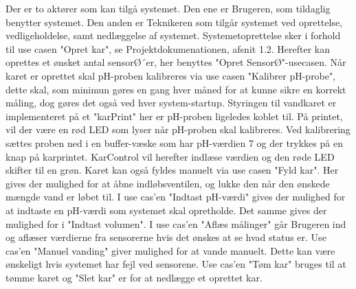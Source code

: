Der er to aktører som kan tilgå systemet. Den ene er Brugeren, som tildaglig benytter systemet. Den anden er Teknikeren som tilgår systemet ved oprettelse, vedligeholdelse, samt nedlæggelse af systemet.\newline 
Systemetoprettelse sker i forhold til use casen "Opret kar", se Projektdokumenationen, afsnit 1.2. Herefter kan oprettes et ønsket antal sensorØ´er, her benyttes "Opret SensorØ"-usecasen. Når karet er oprettet skal pH-proben kalibreres via use casen "Kalibrer pH-probe", dette skal, som minimun gøres en gang hver måned for at kunne sikre en korrekt måling, dog gøres det også ved hver system-startup.\newline 
Styringen til vandkaret er implementeret på et "karPrint" her er pH-proben ligeledes koblet til. På printet, vil der være en rød LED som lyser når pH-proben skal kalibreres. Ved kalibrering sættes proben ned i en buffer-væske som har pH-værdien 7 og der trykkes på en knap på karprintet. KarControl vil herefter indlæse værdien og den røde LED skifter til en grøn. Karet kan også fyldes manuelt via use casen "Fyld kar". Her gives der mulighed for at åbne indløbsventilen, og lukke den når den ønskede mængde vand er løbet til.\newline 
I use cas'en "Indtast pH-værdi" gives der mulighed for at indtaste en pH-værdi som systemet skal opretholde. Det samme gives der mulighed for i "Indtast volumen". I use cas'en "Aflæs målinger" går Brugeren ind og aflæser værdierne fra sensorerne hvis det ønskes at se hvad status er. Use cas'en "Manuel vanding" giver mulighed for at vande manuelt. Dette kan være ønskeligt hvis systemet har fejl ved sensorene. Use cas'en "Tøm kar" bruges til at tømme karet og "Slet kar" er for at nedlægge et oprettet kar.